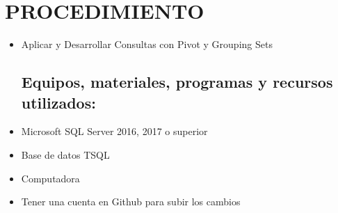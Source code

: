 \section{PROCEDIMIENTO} 

\begin{itemize}
\subsection{Objetivos:}
	\item Aplicar y Desarrollar  Consultas con Pivot y Grouping Sets
\subsection{Equipos, materiales, programas y recursos utilizados:}
	\item Microsoft SQL Server 2016, 2017 o superior
	\item Base de datos TSQL
	\item Computadora
	\item Tener una cuenta en Github para subir los cambios


\end{itemize}